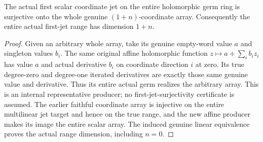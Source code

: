 \begin{lemma}
\label{hir:actual-entire-first-jet-affine-range}
\leanok
{}
The actual first scalar coordinate jet on the entire holomorphic germ ring
is surjective onto the whole genuine $(1+n)$-coordinate array. Consequently
the entire actual first-jet range has dimension $1+n$.
\end{lemma}
\begin{proof}
Given an arbitrary whole array, take its genuine empty-word value $a$ and
singleton values $b_i$. The same original affine holomorphic function
$z\mapsto a+\sum_i b_i z_i$ has value $a$ and actual derivative $b_i$ on
coordinate direction $i$ at zero. Its true degree-zero and degree-one
iterated derivatives are exactly those same genuine value and derivative.
Thus its entire actual germ realizes the arbitrary array. This is an
internal representative producer; no first-jet-surjectivity certificate is
assumed. The earlier faithful coordinate array is injective on the entire
multilinear jet target and hence on the true range, and the new affine
producer makes its image the entire scalar array. The induced genuine
linear equivalence proves the actual range dimension, including $n=0$.
\end{proof}

